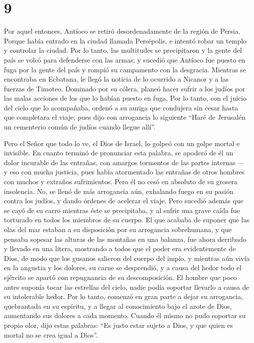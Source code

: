 \hypertarget{section-8}{%
\section{9}\label{section-8}}

 Por aquel entonces, Antíoco se retiró desordenadamente de
la región de Persia.  Porque había entrado en la ciudad
llamada Persépolis, e intentó robar un templo y controlar la ciudad. Por
lo tanto, las multitudes se precipitaron y la gente del país se volcó
para defenderse con las armas; y sucedió que Antíoco fue puesto en fuga
por la gente del país y rompió su campamento con la desgracia.
 Mientras se encontraba en Ecbatana, le llegó la noticia
de lo ocurrido a Nicanor y a las fuerzas de Timoteo. 
Dominado por su cólera, planeó hacer sufrir a los judíos por las malas
acciones de los que lo habían puesto en fuga. Por lo tanto, con el
juicio del cielo que lo acompañaba, ordenó a su auriga que condujera sin
cesar hasta que completara el viaje; pues dijo con arrogancia lo
siguiente ``Haré de Jerusalén un cementerio común de judíos cuando
llegue allí''.

 Pero el Señor que todo lo ve, el Dios de Israel, lo
golpeó con un golpe mortal e invisible. En cuanto terminó de pronunciar
esta palabra, se apoderó de él un dolor incurable de las entrañas, con
amargos tormentos de las partes internas ---  y eso con
mucha justicia, pues había atormentado las entrañas de otros hombres con
muchos y extraños sufrimientos.  Pero él no cesó en
absoluto de su grosera insolencia. No, se llenó de más arrogancia aún,
exhalando fuego en su pasión contra los judíos, y dando órdenes de
acelerar el viaje. Pero sucedió además que se cayó de su carro mientras
éste se precipitaba, y al sufrir una grave caída fue torturado en todos
los miembros de su cuerpo.  El que acababa de suponer que
las olas del mar estaban a su disposición por su arrogancia sobrehumana,
y que pensaba sopesar las alturas de las montañas en una balanza, fue
ahora derribado y llevado en una litera, mostrando a todos que el poder
era evidentemente de Dios,  de modo que los gusanos
salieron del cuerpo del impío, y mientras aún vivía en la angustia y los
dolores, su carne se desprendió, y a causa del hedor todo el ejército se
apartó con repugnancia de su descomposición.  El hombre
que poco antes suponía tocar las estrellas del cielo, nadie podía
soportar llevarlo a causa de su intolerable hedor.  Por
lo tanto, comenzó en gran parte a dejar su arrogancia, quebrantada en su
espíritu, y a llegar al conocimiento bajo el azote de Dios, aumentando
sus dolores a cada momento.  Cuando él mismo no pudo
soportar su propio olor, dijo estas palabras: ``Es justo estar sujeto a
Dios, y que quien es mortal no se crea igual a Dios''.

